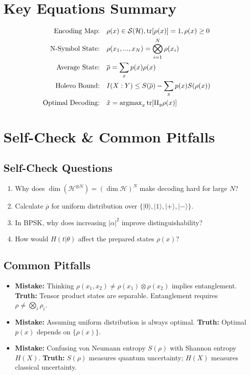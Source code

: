 \documentclass[12pt, a4paper]{article}
\begin{document}
\section{Key Equations Summary}
\begin{align}
\text{Encoding Map:} & \quad \rho(x)\in\mathcal{S}(\mathcal{H}), \tr[\rho(x)] = 1, \rho(x)\ge0 \\
\text{N-Symbol State:} & \quad \rho(x_{1},...,x_{N})=\bigotimes_{i=1}^{N}\rho(x_{i}) \\
\text{Average State:} & \quad \overline{\rho}=\sum_{x}p(x)\rho(x) \\
\text{Holevo Bound:} & \quad I(X:Y)\le S(\overline{\rho})-\sum_{x}p(x)S(\rho(x)) \\
\text{Optimal Decoding:} & \quad \hat{x}=\operatorname{argmax}_{x}\tr[\Pi_{y}\rho(x)]
\end{align}

\section{Self-Check \& Common Pitfalls}

\subsection{Self-Check Questions}
\begin{enumerate}
    \item Why does $\dim(\mathcal{H}^{\otimes N})=(\dim\mathcal{H})^{N}$ make decoding hard for large $N$?
    \item Calculate $\overline{\rho}$ for uniform distribution over $\{|0\rangle,|1\rangle,|+\rangle,|-\rangle\}$.
    \item In BPSK, why does increasing $|\alpha|^{2}$ improve distinguishability?
    \item How would $H(t|\theta)$ affect the prepared states $\rho(x)$?
\end{enumerate}

\subsection{Common Pitfalls}
\begin{itemize}
    \item \textbf{Mistake:} Thinking $\rho(x_{1},x_{2})\ne\rho(x_{1})\otimes\rho(x_{2})$ implies entanglement. \textbf{Truth:} Tensor product states are separable. Entanglement requires $\rho\ne\bigotimes_{i}\rho_{i}$.
    \item \textbf{Mistake:} Assuming uniform distribution is always optimal. \textbf{Truth:} Optimal $p(x)$ depends on $\{\rho(x)\}$.
    \item \textbf{Mistake:} Confusing von Neumann entropy $S(\rho)$ with Shannon entropy $H(X)$. \textbf{Truth:} $S(\rho)$ measures quantum uncertainty; $H(X)$ measures classical uncertainty.
\end{itemize}
\end{document}
